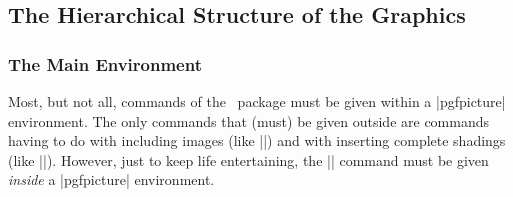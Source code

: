 \subsection{The Hierarchical Structure of the Graphics}

\subsubsection{The Main Environment}

Most, but not all, commands of the \pgfname\ package must be given within a
|{pgfpicture}| environment. The only commands that (must) be given outside are
commands having to do with including images (like |\pgfuseimage|) and with
inserting complete shadings (like |\pgfuseshading|). However, just to keep life
entertaining, the |\pgfshadepath| command must be given \emph{inside} a
|{pgfpicture}| environment.


